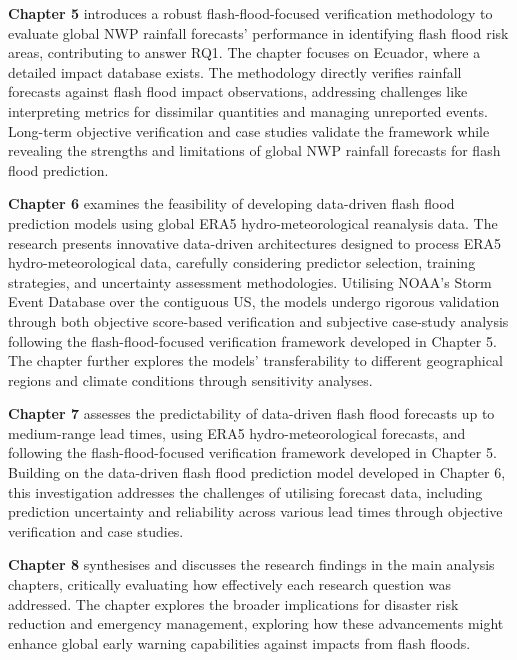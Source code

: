 \textbf{Chapter 5} 
introduces a robust flash-flood-focused verification methodology to evaluate global NWP rainfall forecasts' performance in identifying flash flood risk areas, contributing to answer RQ1. The chapter focuses on Ecuador, where a detailed impact database exists. The methodology directly verifies rainfall forecasts against flash flood impact observations, addressing challenges like interpreting metrics for dissimilar quantities and managing unreported events. Long-term objective verification and case studies validate the framework while revealing the strengths and limitations of global NWP rainfall forecasts for flash flood prediction. 

\textbf{Chapter 6}  examines the feasibility of developing data-driven flash flood prediction models using global ERA5 hydro-meteorological reanalysis data. The research presents innovative data-driven architectures designed to process ERA5 hydro-meteorological data, carefully considering predictor selection, training strategies, and uncertainty assessment methodologies. Utilising NOAA's Storm Event Database over the contiguous US, the models undergo rigorous validation through both objective score-based verification and subjective case-study analysis following the flash-flood-focused verification framework developed in Chapter 5. The chapter further explores the models' transferability to different geographical regions and climate conditions through sensitivity analyses.

\textbf{Chapter 7}  assesses the predictability of data-driven flash flood forecasts up to medium-range lead times, using ERA5 hydro-meteorological forecasts, and following the flash-flood-focused verification framework developed in Chapter 5. Building on the data-driven flash flood prediction model developed in Chapter 6, this investigation addresses the challenges of utilising forecast data, including prediction uncertainty and reliability across various lead times through objective verification and case studies. 

\textbf{Chapter 8}  synthesises and discusses the research findings in the main analysis chapters, critically evaluating how effectively each research question was addressed. The chapter explores the broader implications for disaster risk reduction and emergency management, exploring how these advancements might enhance global early warning capabilities against impacts from flash floods. 

